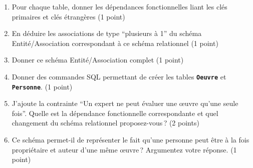 \begin{enumerate}

\item Pour chaque table, donner les dépendances fonctionnelles liant les clés primaires et clés étrangères (1 point)

\item En déduire les associations de type  ``plusieurs à 1'' du schéma Entité/Association correspondant à ce schéma
    relationnel (1 point)

\item Donner ce schéma Entité/Association complet (1 point)


\item Donner des commandes SQL permettant de créer les tables
\texttt{\textbf{Oeuvre}} et \texttt{\textbf{Personne}}. (1 point)

 \item J'ajoute la contrainte ``Un expert ne peut évaluer une {\oe}uvre qu'une
    seule fois''. Quelle est la dépendance fonctionnelle correspondante
     et quel changement du schéma relationnel proposez-vous\,?  (2 points)

    \item Ce schéma permet-il de représenter le fait qu'une personne peut être à la fois  propriétaire et auteur d'une
    même  {\oe}uvre\,? Argumentez votre réponse.
     (1 point)


\end{enumerate}
